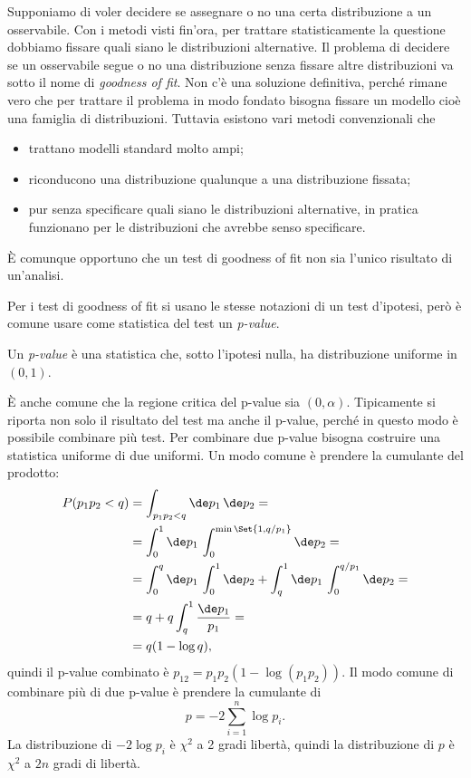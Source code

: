 

Supponiamo di voler decidere se assegnare o no una certa distribuzione a un osservabile.
Con i metodi visti fin'ora,
per trattare statisticamente la questione dobbiamo fissare quali siano le distribuzioni alternative.
Il problema di decidere se un osservabile segue o no una distribuzione
senza fissare altre distribuzioni va sotto il nome di \emph{goodness of fit}.
Non c'è una soluzione definitiva,
perché rimane vero che per trattare il problema in modo fondato
bisogna fissare un modello cioè una famiglia di distribuzioni.
Tuttavia esistono vari metodi convenzionali che
\begin{itemize}
	\item trattano modelli standard molto ampi;
	\item riconducono una distribuzione qualunque a una distribuzione fissata;
	\item pur senza specificare quali siano le distribuzioni alternative,
	in pratica funzionano per le distribuzioni che avrebbe senso specificare.
\end{itemize}
È comunque opportuno che un test di goodness of fit
non sia l'unico risultato di un'analisi.


Per i test di goodness of fit si usano le stesse notazioni di un test d'ipotesi,
però è comune usare come statistica del test un \emph{p-value}.

\begin{definition}[p-value]
	Un \emph{p-value} è una statistica che,
	sotto l'ipotesi nulla,
	ha distribuzione uniforme in $(0,1)$.
\end{definition}

\noindent È anche comune che la regione critica del p-value sia $(0,\alpha)$.
Tipicamente si riporta non solo il risultato del test ma anche il p-value,
perché in questo modo è possibile combinare più test.
Per combinare due p-value bisogna costruire una statistica uniforme di due uniformi.
Un modo comune è prendere la cumulante del prodotto:
\begin{align*}
	P(p_1p_2<q)
	&= \int_{p_1p_2<q}\de p_1\,\de p_2 = \\
	&= \int_0^1\de p_1\, \int_0^{\min\Set{1,q/p_1}} \de p_2 = \\
	&= \int_0^q\de p_1\, \int_0^1 \de p_2
	+ \int_q^1 \de p_1\, \int_0^{q/p_1} \de p_2 = \\
	&= q + q\int_q^1 \frac{\de p_1}{p_1} = \\
	&= q(1-\log q),
\end{align*}
quindi il p-value combinato è $p_{12} = p_1p_2(1-\log(p_1p_2))$.
Il modo comune di combinare più di due p-value è prendere la cumulante di
\begin{equation*}
	p = -2 \sum_{i=1}^n \log p_i.
\end{equation*}
La distribuzione di $-2\log p_i$ è $\chi^2$ a 2 gradi libertà,
quindi la distribuzione di $p$ è $\chi^2$ a $2n$ gradi di libertà.

